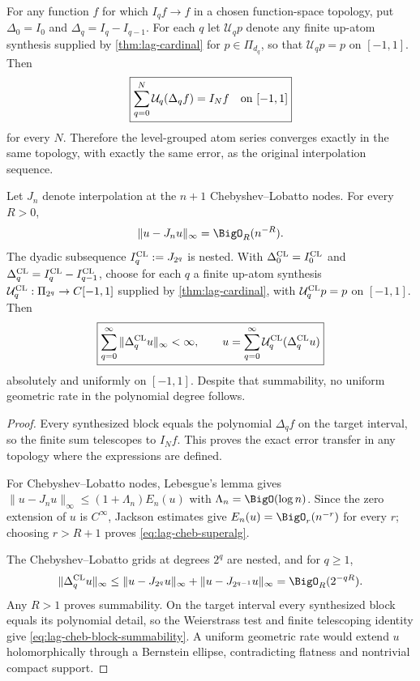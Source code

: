 \begin{corollary}
\label{cor:lag-self-series}
For any function $f$ for which $I_qf\to f$ in a chosen function-space
topology, put $\Delta_0=I_0$ and $\Delta_q=I_q-I_{q-1}$.  For each $q$ let
$\mathcal U_qp$ denote any finite up-atom synthesis supplied by
\cref{thm:lag-cardinal} for $p\in\Pi_{d_q}$, so that
$\mathcal U_qp=p$ on $[-1,1]$.  Then
\begin{equation}
 \boxed{\sum_{q=0}^{N}\mathcal U_q(\Delta_qf)=I_Nf
 \quad\hbox{on }[-1,1]}
 \label{eq:lag-telescoping-atoms}
\end{equation}
for every $N$.  Therefore the level-grouped atom series converges exactly in the
same topology, with exactly the same error, as the original interpolation
sequence.

Let $J_n$ denote interpolation at the $n+1$ Chebyshev--Lobatto nodes.  For
every $R>0$,
\begin{equation}
 \|u-J_nu\|_\infty=\BigO_R(n^{-R}).
 \label{eq:lag-cheb-superalg}
\end{equation}
The dyadic subsequence $I_q^{\rm CL}:=J_{2^q}$ is nested.  With
$\Delta_0^{\rm CL}=I_0^{\rm CL}$ and
$\Delta_q^{\rm CL}=I_q^{\rm CL}-I_{q-1}^{\rm CL}$, choose for each $q$ a
finite up-atom synthesis
$\mathcal U_q^{\rm CL}:\Pi_{2^q}\to C[-1,1]$ supplied by
\cref{thm:lag-cardinal}, with
$\mathcal U_q^{\rm CL}p=p$ on $[-1,1]$.  Then
\begin{equation}
 \boxed{\sum_{q=0}^{\infty}\|\Delta_q^{\rm CL}u\|_\infty<\infty,
 \qquad
 u=\sum_{q=0}^{\infty}\mathcal U_q^{\rm CL}(\Delta_q^{\rm CL}u)}
 \label{eq:lag-cheb-block-summability}
\end{equation}
absolutely and uniformly on $[-1,1]$.  Despite that summability, no uniform
geometric rate in the polynomial degree follows.
\end{corollary}

\begin{proof}
Every synthesized block equals the polynomial $\Delta_qf$ on the target
interval, so the finite sum telescopes to $I_Nf$.  This proves the exact
error transfer in any topology where the expressions are defined.

For Chebyshev--Lobatto nodes, Lebesgue's lemma gives
$\|u-J_nu\|_\infty\le(1+\Lambda_n)E_n(u)$ with
$\Lambda_n=\BigO(\log n)$.  Since the zero extension of $u$ is
$C^\infty$, Jackson estimates give $E_n(u)=\BigO_r(n^{-r})$ for every
$r$; choosing $r>R+1$ proves \eqref{eq:lag-cheb-superalg}.

The Chebyshev--Lobatto grids at degrees $2^q$ are nested, and for $q\ge1$,
\[
 \|\Delta_q^{\rm CL}u\|_\infty
 \le\|u-J_{2^q}u\|_\infty+\|u-J_{2^{q-1}}u\|_\infty
 =\BigO_R(2^{-qR}).
\]
Any $R>1$ proves summability.  On the target interval every synthesized block
equals its polynomial detail, so the Weierstrass test and finite telescoping
identity give \eqref{eq:lag-cheb-block-summability}.  A uniform
geometric rate would extend $u$ holomorphically through a Bernstein ellipse,
contradicting flatness and nontrivial compact support.
\end{proof}

